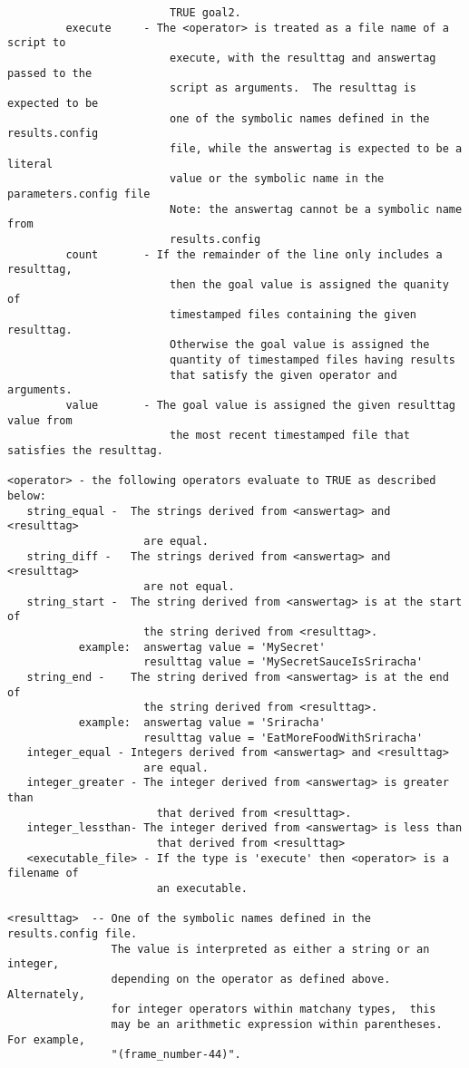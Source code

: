 \documentclass[12pt]{article}
\begin{document}
\begin{verbatim}
                         TRUE goal2.
         execute     - The <operator> is treated as a file name of a script to 
                         execute, with the resulttag and answertag passed to the 
                         script as arguments.  The resulttag is expected to be 
                         one of the symbolic names defined in the results.config 
                         file, while the answertag is expected to be a literal 
                         value or the symbolic name in the parameters.config file 
                         Note: the answertag cannot be a symbolic name from 
                         results.config 
         count       - If the remainder of the line only includes a resulttag,
                         then the goal value is assigned the quanity of 
                         timestamped files containing the given resulttag.  
                         Otherwise the goal value is assigned the
                         quantity of timestamped files having results
                         that satisfy the given operator and arguments.
         value       - The goal value is assigned the given resulttag value from
                         the most recent timestamped file that satisfies the resulttag.
 
<operator> - the following operators evaluate to TRUE as described below:
   string_equal -  The strings derived from <answertag> and <resulttag>
                     are equal.
   string_diff -   The strings derived from <answertag> and <resulttag>
                     are not equal.
   string_start -  The string derived from <answertag> is at the start of 
                     the string derived from <resulttag>.
           example:  answertag value = 'MySecret'
                     resulttag value = 'MySecretSauceIsSriracha'
   string_end -    The string derived from <answertag> is at the end of
                     the string derived from <resulttag>.
           example:  answertag value = 'Sriracha'
                     resulttag value = 'EatMoreFoodWithSriracha'
   integer_equal - Integers derived from <answertag> and <resulttag>
                     are equal.
   integer_greater - The integer derived from <answertag> is greater than
                       that derived from <resulttag>.
   integer_lessthan- The integer derived from <answertag> is less than
                       that derived from <resulttag>
   <executable_file> - If the type is 'execute' then <operator> is a filename of 
                       an executable.
             
<resulttag>  -- One of the symbolic names defined in the results.config file.
                The value is interpreted as either a string or an integer,
                depending on the operator as defined above.  Alternately, 
                for integer operators within matchany types,  this
                may be an arithmetic expression within parentheses.  For example,
                "(frame_number-44)".
                

\end{verbatim}
\end{document}
